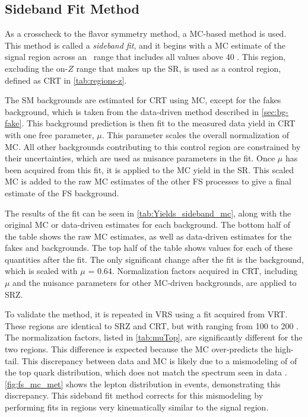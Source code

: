 \subsection{Sideband Fit Method}
\label{sec:method-sideband}

As a crosscheck to the flavor symmetry method, a \ac{MC}-based method is used. This method is called a \textit{sideband fit}, and it begins with a \ac{MC} estimate of the signal region across an \mll~range that includes all values above 40 \gev. This region, excluding the on-$Z$ range that makes up the \ac{SR}, is used as a control region, defined as CRT in \autoref{tab:regions-z}. 

The \ac{SM} backgrounds are estimated for CRT using \ac{MC}, except for the fakes background, which is taken from the data-driven method described in \autoref{sec:bg-fake}. This background prediction is then fit to the measured data yield in CRT with one free parameter, $\mu$. This parameter scales the overall normalization of \ttbar \ac{MC}. All other backgrounds contributing to this control region are constrained by their uncertainties, which are used as nuisance parameters in the fit. Once $\mu$ has been acquired from this fit, it is applied to the \ttbar \ac{MC} yield in the \ac{SR}. This scaled \ttbar \ac{MC} is added to the raw \ac{MC} estimates of the other \ac{FS} processes to give a final estimate of the \ac{FS} background. 

The results of the fit can be seen in \autoref{tab:Yields_sideband_mc}, along with the original \ac{MC} or data-driven estimates for each background. The bottom half of the table shows the raw \ac{MC} estimates, as well as data-driven estimates for the fakes and \dyjets backgrounds. The top half of the table shows values for each of these quantities after the fit. The only significant change after the fit is the \ttbar background, which is scaled with $\mu$ = 0.64. Normalization factors acquired in CRT, including $\mu$ and the nuisance parameters for other \ac{MC}-driven backgrounds, are applied to SRZ. 



To validate the method, it is repeated in VRS using a fit acquired from VRT. These regions are identical to SRZ and CRT, but with \met ranging from 100 to 200 \gev. The normalization factors, listed in \autoref{tab:muTop}, are significantly different for the two regions. This difference is expected because the \ttbar \ac{MC} over-predicts the high-\met tail. This discrepancy between data and \ac{MC} is likely due to a mismodeling of of the top quark \pt distribution, which does not match the spectrum seen in data \cite{Aad:2015hna,Khachatryan:2016gxp}. \autoref{fig:fs_mc_met} shows the lepton \pt distribution in \ttbar events, demonstrating this discrepancy. This sideband fit method corrects for this mismodeling by performing fits in regions very kinematically similar to the signal region. 

